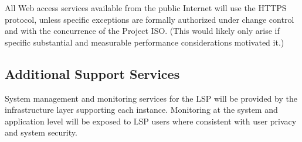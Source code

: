 All Web access services available from the public Internet will use the HTTPS
protocol, unless specific exceptions are formally authorized under change
control and with the concurrence of the Project ISO.
(This would likely only arise if specific substantial and measurable
performance considerations motivated it.)

\subsection{Additional Support Services}\label{additional-support-services}

System management and monitoring services for the LSP will be provided by the
infrastructure layer supporting each instance.  Monitoring at the system and
application level will be exposed to LSP users where consistent with user
privacy and system security.

